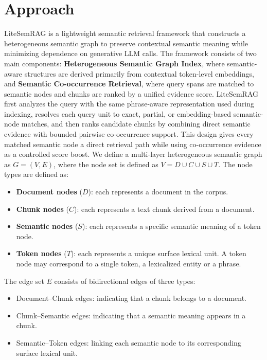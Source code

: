 \documentclass[conference]{IEEEtran}
\begin{document}
\section{Approach}
LiteSemRAG is a lightweight semantic retrieval framework that constructs a heterogeneous semantic graph to preserve contextual semantic meaning while minimizing dependence on generative LLM calls. The framework consists of two main components: \textbf{Heterogeneous Semantic Graph Index}, where semantic-aware structures are derived primarily from contextual token-level embeddings, and \textbf{Semantic Co-occurrence Retrieval}, where query spans are matched to semantic nodes and chunks are ranked by a unified evidence score. LiteSemRAG first analyzes the query with the same phrase-aware representation used during indexing, resolves each query unit to exact, partial, or embedding-based semantic-node matches, and then ranks candidate chunks by combining direct semantic evidence with bounded pairwise co-occurrence support. This design gives every matched semantic node a direct retrieval path while using co-occurrence evidence as a controlled score boost.
We define a multi-layer heterogeneous semantic graph as $G = (V, E)$, where the node set is defined as $V = D \cup C \cup S \cup T$. The node types are defined as:
\begin{itemize}
    \item \textbf{Document nodes} ($D$): each represents a document in the corpus.
    \item \textbf{Chunk nodes} ($C$): each represents a text chunk derived from a document.
    \item \textbf{Semantic nodes} ($S$): each represents a specific semantic meaning of a token node.
    \item \textbf{Token nodes} ($T$): each represents a unique surface lexical unit. A token node may correspond to a single token, a lexicalized entity or a phrase.
\end{itemize}
The edge set $E$ consists of bidirectional edges of three types:
\begin{itemize}
    \item Document--Chunk edges: indicating that a chunk belongs to a document.
    \item Chunk--Semantic edges: indicating that a semantic meaning appears in a chunk.
    \item Semantic--Token edges: linking each semantic node to its corresponding surface lexical unit.
\end{itemize}
\end{document}
